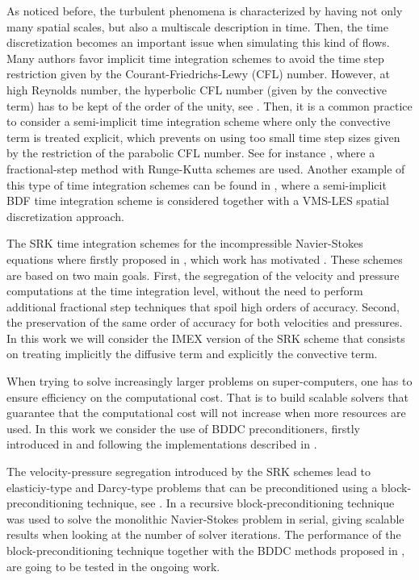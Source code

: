 As noticed before, the turbulent phenomena is characterized by having not only many spatial scales, but also a multiscale description in time. Then, the time discretization becomes an important issue when simulating this kind of flows. Many authors favor implicit time integration schemes to avoid the time step restriction given by the Courant-Friedrichs-Lewy (CFL) number. However, at high Reynolds number, the hyperbolic CFL number (given by the convective term) has to be kept of the order of the unity, see \cite{choi_effects_1994}. Then, it is a common practice to consider a semi-implicit time integration scheme where only the convective term is treated explicit, which prevents on using too small time step sizes given by the restriction of the parabolic CFL number. See for instance \cite{le1991improvement}, where a fractional-step method with Runge-Kutta schemes are used. Another example of this type of time integration schemes can be found in \cite{forti_semi-implicit_2015}, where a semi-implicit BDF time integration scheme is considered together with a VMS-LES spatial discretization approach.

The SRK time integration schemes for the incompressible Navier-Stokes equations where firstly proposed in \cite{colomes_segregated_2015}, which work has motivated . These schemes are based on two main goals. First, the segregation of the velocity and pressure computations at the time integration level, without the need to perform additional fractional step techniques that spoil high orders of accuracy. Second, the preservation of the same order of accuracy for both velocities and pressures. In this work we will consider the IMEX version of the SRK scheme that consists on treating implicitly the diffusive term and explicitly the convective term.

When trying to solve increasingly larger problems on super-computers, one has to ensure efficiency on the computational cost. That is to build scalable solvers that guarantee that the computational cost will not increase when more resources are used. In this work we consider the use of BDDC preconditioners, firstly introduced in \cite{dohrmann_preconditioner_2003} and following the implementations described in \cite{badia_highly_2014,alberto_f._martin_santiago_badia_and_javier_principe_multilevel_????}.

The velocity-pressure segregation introduced by the SRK schemes lead to elasticiy-type and Darcy-type problems that can be preconditioned using a block-preconditioning technique, see \cite{badia_block_2014}. In \cite{colomes_mixed_2015} a recursive block-preconditioning technique was used to solve the monolithic Navier-Stokes problem in serial, giving scalable results when looking at the number of solver iterations. The performance of the block-preconditioning technique together with the BDDC methods proposed in \cite{alberto_f._martin_santiago_badia_and_javier_principe_multilevel_????}, are going to be tested in the ongoing work.

